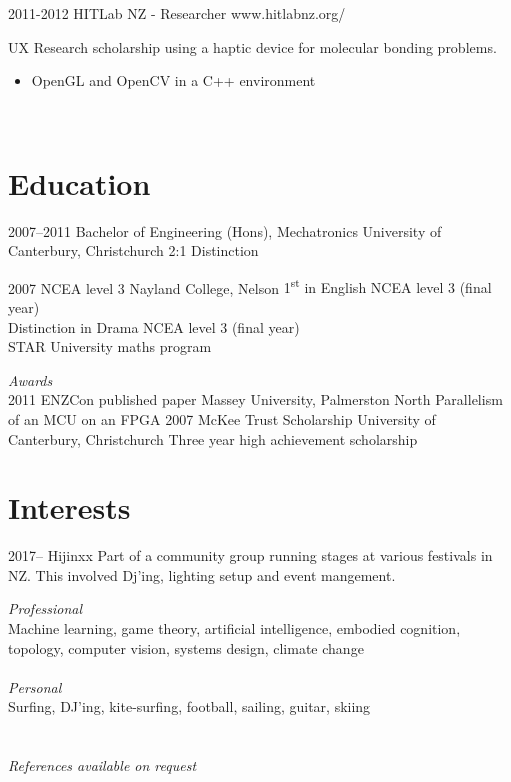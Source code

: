 \documentclass[print]{friggeri-cv} %
\begin{document}
\begin{entrylist}
\entry
{2011-2012}
{HITLab NZ - Researcher}
{www.hitlabnz.org/}
{UX Research scholarship using a haptic device for molecular bonding problems.
\begin{itemize}
\item OpenGL and OpenCV in a C++ environment 
\end{itemize}}
\end{entrylist}\\ 

\section{Education}
\begin{entrylist}
\entry
{2007--2011}
{Bachelor of Engineering (Hons), Mechatronics}
{University of Canterbury, Christchurch}
{2:1 Distinction}

\entry
{2007}
{NCEA level 3}
{Nayland College, Nelson}
{1\textsuperscript{st} in English NCEA level 3 (final year)\\
Distinction in Drama NCEA level 3 (final year)\\
STAR University maths program}

\emph{Awards}\\
\entry
{2011}
{ENZCon published paper}
{Massey University, Palmerston North}
{Parallelism of an MCU on an FPGA}
\entry
{2007}
{McKee Trust Scholarship}
{University of Canterbury, Christchurch}
{Three year high achievement scholarship}
\end{entrylist}

\section{Interests}
\begin{entrylist}
\entry 
{2017--}
{Hijinxx}
{}
{Part of a community group running stages at various festivals in NZ. This involved Dj'ing, lighting setup and event mangement.}
\end{entrylist}

\emph{Professional}\\ Machine learning, game theory, artificial intelligence, embodied cognition, topology, computer vision, systems design, climate change\\
\\
\emph{Personal}\\ Surfing, DJ'ing, kite-surfing, football, sailing, guitar, skiing
\\ \\ \\
\emph{References available on request}
\end{document}
